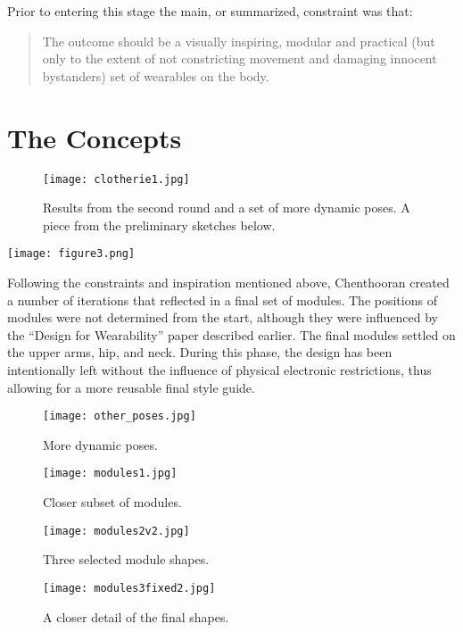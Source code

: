 Prior to entering this stage the main, or summarized, constraint was that:

\begin{quote}
The outcome should be a visually inspiring, modular and practical (but only to the extent of not constricting movement and damaging innocent bystanders) set of wearables on the body.
\end{quote}

\newpage

\section{The Concepts}\label{sec:concepts}

\begin{figure}
  \texttt{[image: clotherie1.jpg]}
  \caption{Results from the second round and a set of more dynamic poses. A piece from the preliminary sketches below.}
  \label{fig:secondround}
\end{figure}

\begin{marginfigure}
  \texttt{[image: figure3.png]}
  \label{fig:secondround}
\end{marginfigure}

Following the constraints and inspiration mentioned above, Chenthooran created a number of iterations that reflected in a final set of modules. The positions of modules were not determined from the start, although they were influenced by the ``Design for Wearability'' paper \citep{Gemperle98} described earlier. The final modules settled on the upper arms, hip, and neck. During this phase, the design has been intentionally left without the influence of physical electronic restrictions, thus allowing for a more reusable final style guide.

\begin{figure}
  \texttt{[image: other\_poses.jpg]}
  \caption{More dynamic poses.}
  \label{fig:dynamicposes}
\end{figure}

\begin{figure}
  \texttt{[image: modules1.jpg]}
  \caption{Closer subset of modules.}
  \label{fig:subsetofmods}
\end{figure}

\begin{figure}
  \texttt{[image: modules2v2.jpg]}
  \caption{Three selected module shapes.}
  \label{fig:selectedmods}
\end{figure}

\begin{figure*}
  \texttt{[image: modules3fixed2.jpg]}
  \caption{A closer detail of the final shapes.}
  \label{fig:finalmods}
\end{figure*}
